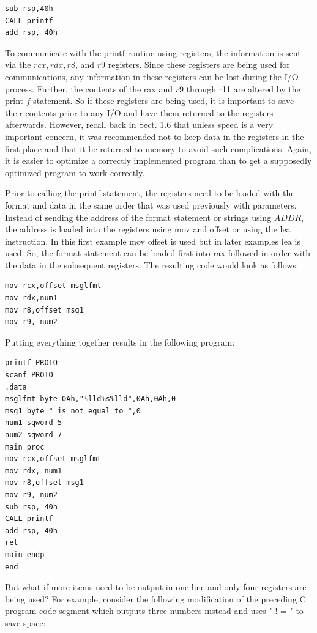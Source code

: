 \documentclass[10pt]{article}
\begin{document}
\begin{verbatim}
sub rsp,40h
CALL printf
add rsp, 40h
\end{verbatim}

To communicate with the printf routine using registers, the information is sent via the $r c x, r d x, r 8$, and $r 9$ registers. Since these registers are being used for communications, any information in these registers can be lost during the I/O process. Further, the contents of the rax and $r 9$ through r11 are altered by the print $f$ statement. So if these registers are being used, it is important to save their contents prior to any I/O and have them returned to the registers afterwards. However, recall back in Sect. 1.6 that unless speed is a very important concern, it was recommended not to keep data in the registers in the first place and that it be returned to memory to avoid such complications. Again, it is easier to optimize a correctly implemented program than to get a supposedly optimized program to work correctly.

Prior to calling the printf statement, the registers need to be loaded with the format and data in the same order that was used previously with parameters. Instead of sending the address of the format statement or strings using $A D D R$, the address is loaded into the registers using mov and offset or using the lea instruction. In this first example mov offset is used but in later examples lea is used. So, the format statement can be loaded first into rax followed in order with the data in the subsequent registers. The resulting code would look as follows:

\begin{verbatim}
mov rcx,offset msglfmt
mov rdx,num1
mov r8,offset msg1
mov r9, num2
\end{verbatim}

Putting everything together results in the following program:

\begin{verbatim}
printf PROTO
scanf PROTO
.data
msglfmt byte 0Ah,"%lld%s%lld",0Ah,0Ah,0
msg1 byte " is not equal to ",0
num1 sqword 5
num2 sqword 7
main proc
mov rcx,offset msglfmt
mov rdx, num1
mov r8,offset msg1
mov r9, num2
sub rsp, 40h
CALL printf
add rsp, 40h
ret
main endp
end
\end{verbatim}

But what if more items need to be output in one line and only four registers are being used? For example, consider the following modification of the preceding C program code segment which outputs three numbers instead and uses " ! = " to save space:
\end{document}
